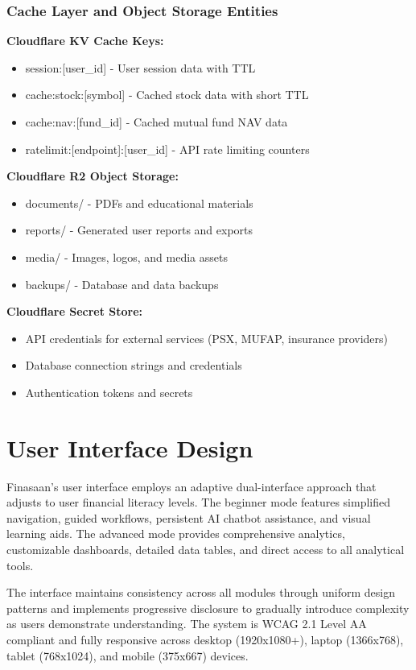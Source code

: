 \documentclass[12pt,a4paper]{report}
\begin{document}
\subsection{Cache Layer and Object Storage Entities}

\textbf{Cloudflare KV Cache Keys:}
\begin{itemize}
    \item session:[user\_id] - User session data with TTL
    \item cache:stock:[symbol] - Cached stock data with short TTL
    \item cache:nav:[fund\_id] - Cached mutual fund NAV data
    \item ratelimit:[endpoint]:[user\_id] - API rate limiting counters
\end{itemize}

\textbf{Cloudflare R2 Object Storage:}
\begin{itemize}
    \item documents/ - PDFs and educational materials
    \item reports/ - Generated user reports and exports
    \item media/ - Images, logos, and media assets
    \item backups/ - Database and data backups
\end{itemize}

\textbf{Cloudflare Secret Store:}
\begin{itemize}
    \item API credentials for external services (PSX, MUFAP, insurance providers)
    \item Database connection strings and credentials
    \item Authentication tokens and secrets
\end{itemize}

\chapter{User Interface Design}

Finasaan's user interface employs an adaptive dual-interface approach that adjusts to user financial literacy levels. The beginner mode features simplified navigation, guided workflows, persistent AI chatbot assistance, and visual learning aids. The advanced mode provides comprehensive analytics, customizable dashboards, detailed data tables, and direct access to all analytical tools.

The interface maintains consistency across all modules through uniform design patterns and implements progressive disclosure to gradually introduce complexity as users demonstrate understanding. The system is WCAG 2.1 Level AA compliant and fully responsive across desktop (1920x1080+), laptop (1366x768), tablet (768x1024), and mobile (375x667) devices.
\end{document}
